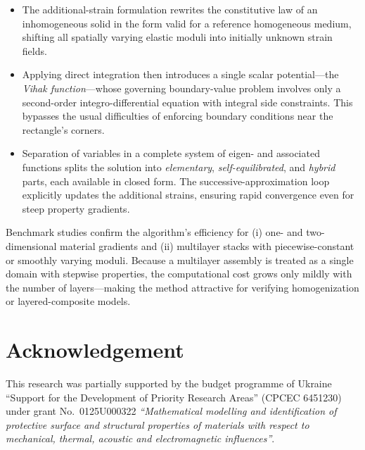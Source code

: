 \begin{itemize}
	\item  The additional-strain formulation rewrites the constitutive law of an inhomogeneous solid in the form valid for a reference homogeneous medium, shifting all spatially varying elastic moduli into initially unknown strain fields.  
	\item  Applying direct integration then introduces a single scalar potential—the \emph{Vihak function}—whose governing boundary-value problem involves only a second-order integro-differential equation with integral side constraints.  This bypasses the usual difficulties of enforcing boundary conditions near the rectangle’s corners.  
	\item  Separation of variables in a complete system of eigen- and associated functions splits the solution into \emph{elementary}, \emph{self-equilibrated}, and \emph{hybrid} parts, each available in closed form.  The successive-approximation loop explicitly updates the additional strains, ensuring rapid convergence even for steep property gradients.  
\end{itemize}

Benchmark studies confirm the algorithm’s efficiency for (i) one- and two-dimensional material gradients and (ii) multilayer stacks with piecewise-constant or smoothly varying moduli.  Because a multilayer assembly is treated as a single domain with stepwise properties, the computational cost grows only mildly with the number of layers—making the method attractive for verifying homogenization or layered-composite models.

\bigskip
\section*{Acknowledgement}
This research was partially supported by the budget programme of Ukraine
``Support for the Development of Priority Research Areas''
(CPCEC 6451230) under grant No.~0125U000322
\emph{``Mathematical modelling and identification of protective surface and structural
	properties of materials with respect to mechanical, thermal, acoustic and electromagnetic influences''}.





